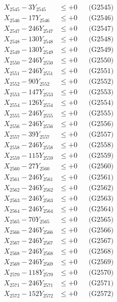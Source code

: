 \documentclass[a4paper,10pt]{article}
\begin{document}
{\begin{align}
X_{2545} - 3Y_{2545} &\leq +0 && \text{(G2545)} \\
X_{2546} - 17Y_{2546} &\leq +0 && \text{(G2546)} \\
X_{2547} - 246Y_{2547} &\leq +0 && \text{(G2547)} \\
X_{2548} - 130Y_{2548} &\leq +0 && \text{(G2548)} \\
X_{2549} - 130Y_{2549} &\leq +0 && \text{(G2549)} \\
X_{2550} - 246Y_{2550} &\leq +0 && \text{(G2550)} \\
\allowbreak
X_{2551} - 246Y_{2551} &\leq +0 && \text{(G2551)} \\
X_{2552} - 90Y_{2552} &\leq +0 && \text{(G2552)} \\
X_{2553} - 147Y_{2553} &\leq +0 && \text{(G2553)} \\
X_{2554} - 126Y_{2554} &\leq +0 && \text{(G2554)} \\
X_{2555} - 246Y_{2555} &\leq +0 && \text{(G2555)} \\
X_{2556} - 246Y_{2556} &\leq +0 && \text{(G2556)} \\
X_{2557} - 39Y_{2557} &\leq +0 && \text{(G2557)} \\
X_{2558} - 246Y_{2558} &\leq +0 && \text{(G2558)} \\
X_{2559} - 115Y_{2559} &\leq +0 && \text{(G2559)} \\
X_{2560} - 27Y_{2560} &\leq +0 && \text{(G2560)} \\
\allowbreak
X_{2561} - 246Y_{2561} &\leq +0 && \text{(G2561)} \\
X_{2562} - 246Y_{2562} &\leq +0 && \text{(G2562)} \\
X_{2563} - 246Y_{2563} &\leq +0 && \text{(G2563)} \\
X_{2564} - 246Y_{2564} &\leq +0 && \text{(G2564)} \\
X_{2565} - 70Y_{2565} &\leq +0 && \text{(G2565)} \\
X_{2566} - 246Y_{2566} &\leq +0 && \text{(G2566)} \\
X_{2567} - 246Y_{2567} &\leq +0 && \text{(G2567)} \\
X_{2568} - 246Y_{2568} &\leq +0 && \text{(G2568)} \\
X_{2569} - 246Y_{2569} &\leq +0 && \text{(G2569)} \\
X_{2570} - 118Y_{2570} &\leq +0 && \text{(G2570)} \\
\allowbreak
X_{2571} - 246Y_{2571} &\leq +0 && \text{(G2571)} \\
X_{2572} - 152Y_{2572} &\leq +0 && \text{(G2572)} \\

\end{align}}
\end{document}
